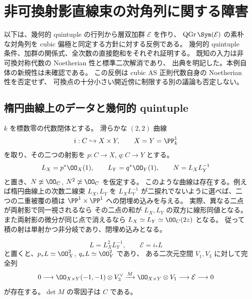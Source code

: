 \section{非可換射影直線束の対角列に関する障害}
\label{sec:ruled-diagonal-obstruction}

以下は、幾何的 quintuple の行列から層双加群 $\mathcal E$ を作り、
$\operatorname{QGr}\Sym(\mathcal E)$ の素朴な対角列を cubic 偏極と同定する方針に対する反例である。
幾何的 quintuple 条件、加群の関係式、全次数の直接飽和をそれぞれ証明する。
既知の入力は非可換対称代数の Noetherian 性と標準二次解消であり、
出典を明記した。本例自体の新規性は未確認である。
この反例は cubic AS 正則代数自身の Noetherian 性を否定せず、
可換点の十分小さい開近傍に制限する別の議論も否定しない。

\subsection{楕円曲線上のデータと幾何的 quintuple}

$k$ を標数零の代数閉体とする。
滑らかな $(2,2)$ 曲線
\[
 i:C\hookrightarrow X\times Y,\qquad X=Y=\PP^1_k
\]
を取り、その二つの射影を $p:C\to X$, $q:C\to Y$ とする。
\[
 L_X=p^*\OO_X(1),\qquad L_Y=q^*\OO_Y(1),\qquad N=L_XL_Y^{-1}
\]
と置き、$N\not\simeq\OO_C$, $N^2\not\simeq\OO_C$ を仮定する。
このような曲線は存在する。例えば楕円曲線上の次数二線束 $L_X,L_Y$ を
$L_XL_Y^{-1}$ が二捩れでないように選べば、二つの二重被覆の積は
$\PP^1\times\PP^1$ への閉埋め込みを与える。
実際、異なる二点が両射影で同一視されるなら
その二点の和が $L_X,L_Y$ の双方に線形同値となる。
また両射影の微分が同じ点で消えるなら $L_X\simeq L_Y\simeq\OO_C(2z)$ となる。
従って積の射は単射かつ非分岐であり、閉埋め込みとなる。

\begin{lemma}\label{ruled-lem:resolution}
\[
 L=L_X^2L_Y^{-1},\qquad \mathcal E=i_*L
\]
と置くと、$p_*L\simeq\OO_X^2$, $q_*L\simeq\OO_Y^2$ であり、
ある二次元空間 $V_1,V_3$ に対して完全列
\begin{equation}\label{ruled-eq:matrix-resolution}
 0\longrightarrow\OO_{X\times Y}(-1,-1)\otimes V_3^\vee
 \xrightarrow{M}\OO_{X\times Y}\otimes V_1
 \longrightarrow\mathcal E\longrightarrow0
\end{equation}
が存在する。$\det M$ の零因子は $C$ である。
\end{lemma}

